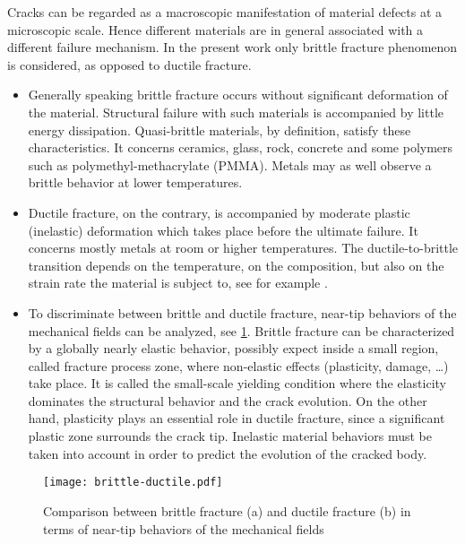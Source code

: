 Cracks can be regarded as a macroscopic manifestation of material defects at a microscopic scale. Hence different materials are in general associated with a different failure mechanism. In the present work only brittle fracture phenomenon is considered, as opposed to ductile fracture.
\begin{itemize}
\item Generally speaking brittle fracture occurs without significant deformation of the material. Structural failure with such materials is accompanied by little energy dissipation. Quasi-brittle materials, by definition, satisfy these characteristics. It concerns ceramics, glass, rock, concrete and some polymers such as polymethyl-methacrylate (PMMA). Metals may as well observe a brittle behavior at lower temperatures.

\item Ductile fracture, on the contrary, is accompanied by moderate plastic (inelastic) deformation which takes place before the ultimate failure. It concerns mostly metals at room or higher temperatures. The ductile-to-brittle transition depends on the temperature, on the composition, but also on the strain rate the material is subject to, see for example \cite{Kalthoff:2000}.

\item To discriminate between brittle and ductile fracture, near-tip behaviors of the mechanical fields can be analyzed, see \cref{fig:brittleductile}. Brittle fracture can be characterized by a globally nearly elastic behavior, possibly expect inside a small region, called fracture process zone, where non-elastic effects (plasticity, damage, \ldots) take place. It is called the small-scale yielding condition where the elasticity dominates the structural behavior and the crack evolution. On the other hand, plasticity plays an essential role in ductile fracture, since a significant plastic zone surrounds the crack tip. Inelastic material behaviors must be taken into account in order to predict the evolution of the cracked body.
\end{itemize} 
\begin{figure}[htbp]
\centering
\texttt{[image: brittle-ductile.pdf]}
\caption{Comparison between brittle fracture (a) and ductile fracture (b) in terms of near-tip behaviors of the mechanical fields} \label{fig:brittleductile}
\end{figure}

